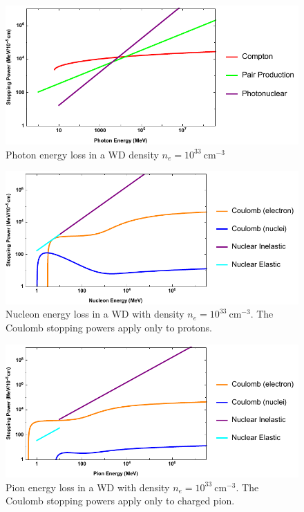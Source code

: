 \documentclass[twocolumn,preprintnumbers,amsmath,amssymb,prl, superscriptaddress]{revtex4}
\begin{document}
\begin{appendices}
\begin{figure}
\includegraphics[scale=.60]{SPphoton.pdf}
\caption{Photon energy loss in a WD density $n_e = 10^{33} ~\text{cm}^{-3}$}
\label{fig:SPphoton}
\end{figure}

\begin{figure}
\includegraphics[scale=.60]{SPnucleon.pdf}
\caption{Nucleon energy loss in a WD with density $n_e = 10^{33} ~\text{cm}^{-3}$. The Coulomb stopping powers apply only to protons.}
\label{fig:SPnuc}
\end{figure}

\begin{figure}
\includegraphics[scale=.60]{SPpion.pdf}
\caption{Pion energy loss in a WD with density $n_e = 10^{33} ~\text{cm}^{-3}$. The Coulomb stopping powers apply only to charged pion.}
\label{fig:SPpion}
\end{figure}


\end{appendices}
\end{document}
